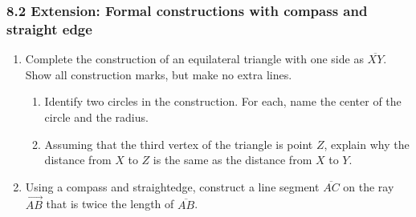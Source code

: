 

\fancyhead[LE]{\thepage}



\subsubsection*{8.2 Extension: Formal constructions with compass and straight edge}
\begin{enumerate}
\item Complete the construction of an equilateral triangle with one side as $\overline{XY}$. Show all construction marks, but make no extra lines. \vspace{6cm}
\begin{center}
\end{center} \vspace{1cm}
\begin{enumerate}
  \item Identify two circles in the construction. For each, name the center of the circle and the radius.  \vspace{2cm}
  \item Assuming that the third vertex of the triangle is point $Z$, explain why the distance from $X$ to $Z$ is the same as the distance from $X$ to $Y$.
\end{enumerate} \vspace{2cm}

\item Using a compass and straightedge, construct a line segment $\overline{AC}$ on the ray $\overrightarrow{AB}$ that is twice the length of $\overline{AB}$.\vspace{2cm}
  \begin{center}
\end{center}


\end{enumerate}
